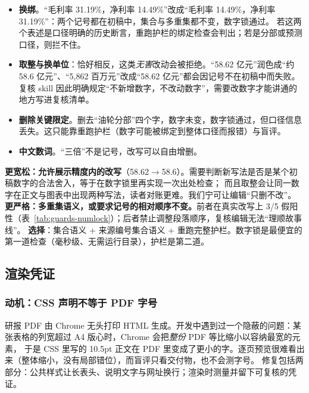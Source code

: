 \begin{itemize}
\item \textbf{换绑}。“毛利率 31.19\%，净利率 14.49\%”改成“毛利率 14.49\%，净利率 31.19\%”：两个记号都在初稿中，集合与多重集都不变，数字锁通过。
  若这两个表述是口径明确的历史断言，重跑护栏的绑定检查会判出；若是分部或预测口径，则拦不住。
\item \textbf{取整与换单位}：恰好相反，这类\emph{无害}改动会被拒绝。“58.62 亿元”润色成“约 58.6 亿元”、“5,862 百万元”改成“58.62 亿元”都会因记号不在初稿中而失败。
  复核 skill 因此明确规定“不新增数字，不改动数字”，需要改数字才能讲通的地方写进复核清单。
\item \textbf{删除关键限定}。删去“油轮分部”四个字，数字未变，数字锁通过，但口径信息丢失。这只能靠重跑护栏（数字可能被绑定到整体口径而报错）与盲评。
\item \textbf{中文数词}。“三倍”不是记号，改写可以自由增删。
\end{itemize}

\begin{tradeoff}[：数字锁的严格程度]
\textbf{更宽松：允许展示精度内的改写}（58.62$\to$58.6）。需要判断新写法是否是某个初稿数字的合法舍入，等于在数字锁里再实现一次出处检查；
而且取整会让同一数字在正文与图表中出现两种写法，读者对账更难。我们宁可让编辑“只删不改”。
\textbf{更严格：多重集语义，或要求记号的相对顺序不变。}前者在真实改写上 3/5 假阳性（表~\ref{tab:guards-numlock}）；后者禁止调整段落顺序，复核编辑无法“理顺故事线”。
\textbf{选择}：集合语义 + 来源编号集合语义 + 重跑完整护栏。数字锁是最便宜的第一道检查（毫秒级、无需运行目录），护栏是第二道。
\end{tradeoff}

\subsection{渲染凭证}
\label{sec:guards-render}

\subsubsection{动机：CSS 声明不等于 PDF 字号}

研报 PDF 由 Chrome 无头打印 HTML 生成。开发中遇到过一个隐蔽的问题：某张表格的列宽超过 A4 版心时，Chrome 会把\emph{整份} PDF 等比缩小以容纳最宽的元素，
于是 CSS 里写的 10.5pt 正文在 PDF 里变成了更小的字。逐页预览很难看出来（整体缩小，没有局部错位），而盲评只看交付物，也不会测字号。
修复包括两部分：公共样式让长表头、说明文字与网址换行；渲染时测量并留下可复核的凭证。

